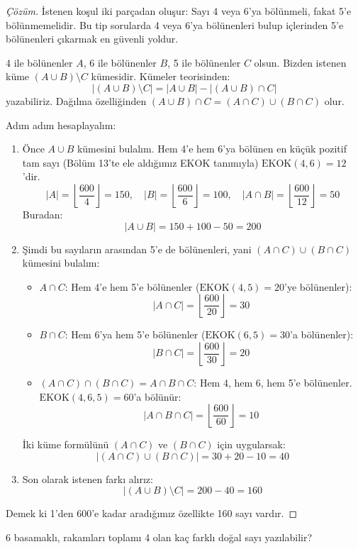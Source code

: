 \begin{proof}[Çözüm]
İstenen koşul iki parçadan oluşur: Sayı 4 veya 6'ya bölünmeli, fakat 5'e
bölünmemelidir. Bu tip sorularda 4 veya 6'ya bölünenleri bulup içlerinden 5'e
bölünenleri çıkarmak en güvenli yoldur.

4 ile bölünenler $A$, 6 ile bölünenler $B$, 5 ile bölünenler $C$ olsun. Bizden istenen
küme $(A \cup B) \setminus C$ kümesidir. Kümeler teorisinden: \[ |(A \cup B)
\setminus C| = |A \cup B| - |(A \cup B) \cap C| \] yazabiliriz. Dağılma
özelliğinden $(A \cup B) \cap C = (A \cap C) \cup (B \cap C)$ olur.

Adım adım hesaplayalım: \begin{enumerate} \item Önce $A \cup B$ kümesini bulalım.
Hem 4'e hem 6'ya bölünen en küçük pozitif tam sayı (Bölüm 13'te ele aldığımız
EKOK tanımıyla) $\text{EKOK}(4, 6) = 12$'dir. \[ |A| = \left\lfloor \frac{600}{4}
\right\rfloor = 150, \quad |B| = \left\lfloor \frac{600}{6} \right\rfloor = 100,
\quad |A \cap B| = \left\lfloor \frac{600}{12} \right\rfloor = 50 \] Buradan: \[ |A
\cup B| = 150 + 100 - 50 = 200 \] \item Şimdi bu sayıların arasından 5'e de
bölünenleri, yani $(A \cap C) \cup (B \cap C)$ kümesini bulalım:
\begin{itemize} \item $A \cap C$: Hem 4'e hem 5'e bölünenler ($\text{EKOK}(4, 5) = 20$'ye
bölünenler): \[ |A \cap C| = \left\lfloor \frac{600}{20} \right\rfloor = 30 \]
\item $B \cap C$: Hem 6'ya hem 5'e bölünenler ($\text{EKOK}(6, 5) = 30$'a
bölünenler): \[ |B \cap C| = \left\lfloor \frac{600}{30} \right\rfloor = 20 \]
\item $(A \cap C) \cap (B \cap C) = A \cap B \cap C$: Hem 4, hem 6, hem 5'e bölünenler.
$\text{EKOK}(4, 6, 5) = 60$'a bölünür: \[ |A \cap B \cap C| = \left\lfloor
\frac{600}{60} \right\rfloor = 10 \] \end{itemize} İki küme formülünü $(A \cap C)$
ve $(B \cap C)$ için uygularsak: \[ |(A \cap C) \cup (B \cap C)| = 30 + 20 - 10 =
40 \] \item Son olarak istenen farkı alırız: \[ |(A \cup B) \setminus C| = 200 -
40 = 160 \] \end{enumerate} Demek ki 1'den 600'e kadar aradığımız özellikte 160
sayı vardır. \end{proof}

\begin{example} 6 basamaklı, rakamları toplamı 4 olan kaç farklı doğal sayı
yazılabilir? \end{example}


